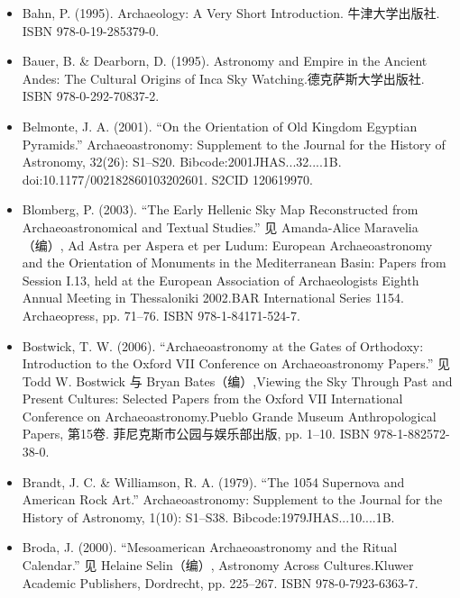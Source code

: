 \begin{itemize}
    \item Bahn, P. (1995). Archaeology: A Very Short Introduction. 牛津大学出版社. ISBN 978-0-19-285379-0.
    \item Bauer, B. \& Dearborn, D. (1995). Astronomy and Empire in the Ancient Andes: The Cultural Origins of Inca Sky Watching.德克萨斯大学出版社. ISBN 978-0-292-70837-2.
    \item Belmonte, J. A. (2001). “On the Orientation of Old Kingdom Egyptian Pyramids.” Archaeoastronomy: Supplement to the Journal for the History of Astronomy, 32(26): S1–S20. Bibcode:2001JHAS...32....1B. doi:10.1177/002182860103202601. S2CID 120619970.
    \item Blomberg, P. (2003). “The Early Hellenic Sky Map Reconstructed from Archaeoastronomical and Textual Studies.” 见 Amanda-Alice Maravelia（编）, Ad Astra per Aspera et per Ludum: European Archaeoastronomy and the Orientation of Monuments in the Mediterranean Basin: Papers from Session I.13, held at the European Association of Archaeologists Eighth Annual Meeting in Thessaloniki 2002.BAR International Series 1154. Archaeopress, pp. 71–76. ISBN 978-1-84171-524-7.
    \item Bostwick, T. W. (2006). “Archaeoastronomy at the Gates of Orthodoxy: Introduction to the Oxford VII Conference on Archaeoastronomy Papers.” 见 Todd W. Bostwick 与 Bryan Bates（编）,Viewing the Sky Through Past and Present Cultures: Selected Papers from the Oxford VII International Conference on Archaeoastronomy.Pueblo Grande Museum Anthropological Papers, 第15卷. 菲尼克斯市公园与娱乐部出版, pp. 1–10. ISBN 978-1-882572-38-0.
    \item Brandt, J. C. \& Williamson, R. A. (1979). “The 1054 Supernova and American Rock Art.” Archaeoastronomy: Supplement to the Journal for the History of Astronomy, 1(10): S1–S38. Bibcode:1979JHAS...10....1B.
    \item Broda, J. (2000). “Mesoamerican Archaeoastronomy and the Ritual Calendar.” 见 Helaine Selin（编）, Astronomy Across Cultures.Kluwer Academic Publishers, Dordrecht, pp. 225–267. ISBN 978-0-7923-6363-7.
\end{itemize}



